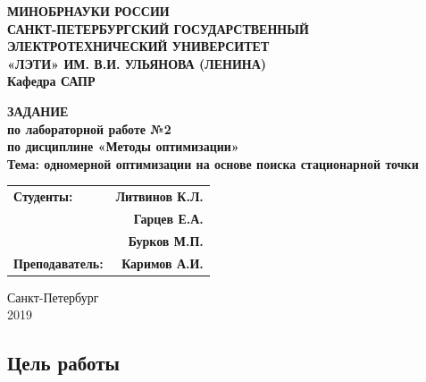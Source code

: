 \documentclass[a4paper,12pt]{article}
\begin{document}
\thispagestyle{empty} %

\begin{centering}
	\textbf{
{\large МИНОБРНАУКИ РОССИИ\\
САНКТ-ПЕТЕРБУРГСКИЙ ГОСУДАРСТВЕННЫЙ\\
ЭЛЕКТРОТЕХНИЧЕСКИЙ УНИВЕРСИТЕТ\\
«ЛЭТИ» ИМ. В.И. УЛЬЯНОВА (ЛЕНИНА)\\
Кафедра САПР}\\
}
\end{centering}


\vspace{7cm}

\begin{centering}
\textbf{ {\large 
ЗАДАНИЕ\\
по лабораторной работе №2\\
по дисциплине «Методы оптимизации»\\
Тема:  одномерной оптимизации на основе поиска
стационарной точки\guillemotright\\
}}
\end{centering}

\vspace{4cm}

\begin{tabular}{l r}
    \textbf{ {\large Студенты:}}&\hspace{6cm} \textbf{ {\large Литвинов К.Л.}}\\
   \textbf{}&\hspace{6cm} \textbf{ {\large Гарцев Е.А.}}\\
   \textbf{{}}&\hspace{6cm} \textbf{\large{Бурков М.П.}}\\
    \textbf{ {\large Преподаватель:}}&\hspace{6cm} \textbf{ {\large Каримов А.И.}}\\
\end{tabular}

\vspace{6cm}


\begin{centering}
	{\large
Санкт-Петербург \\
2019 \\
}
\end{centering}

\newpage
 
\subsection*{Цель работы}
\end{document}
